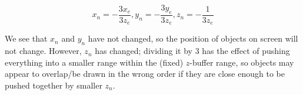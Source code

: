 \documentclass[11pt]{tingpset}
\begin{document}
    \[
      x_n = -\frac{3x_e}{3z_e}, y_n = -\frac{3y_e}{3z_e}, z_n = -\frac{1}{3z_e}
    \]

    We see that $x_n$ and $y_n$ have not changed, so the position of objects on screen will not change. However, $z_n$ has changed; dividing it by 3 has the effect of pushing everything into a smaller range within the (fixed) $z$-buffer range, so objects may appear to overlap/be drawn in the wrong order if they are close enough to be pushed together by smaller $z_n$.



\end{document}
